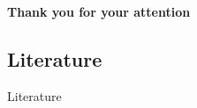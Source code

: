 \documentclass[xcolor={table}]{beamer}
\begin{document}
\begin{frame}
    \vfill
    \begin{center}
        \huge\bfseries
        Thank you for your attention
        \vfill
    \end{center}
    \vfill
\end{frame}

\appendix

		\subsection{Literature}                
            \begin{frame}[allowframebreaks]{Literature}
			\footnotesize
				\nocite{*}
				
				 
            \end{frame}
\end{document}
